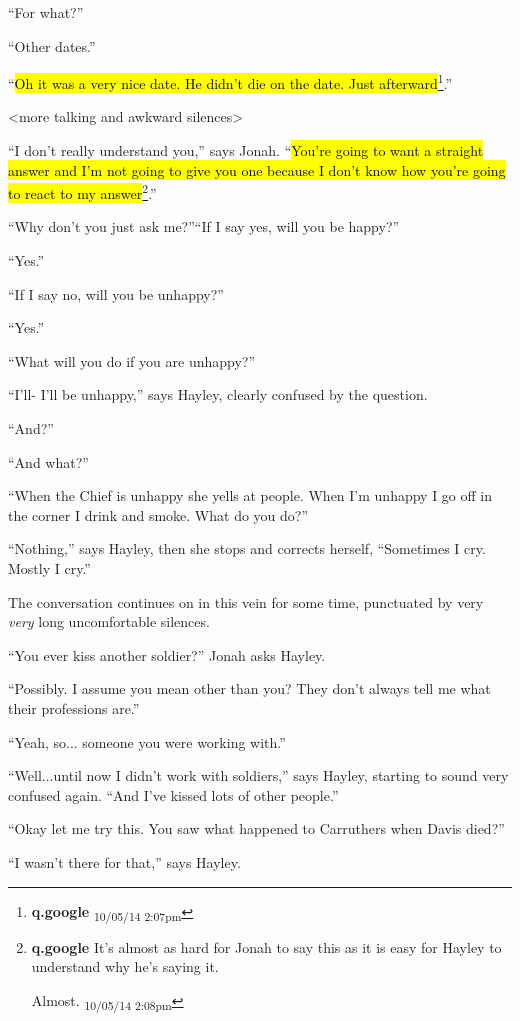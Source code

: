 ``For what?''

``Other dates.''

``\hl{Oh it was a very nice date.  He didn't die on the date.  Just afterward}\footnote{\textbf{q.google } \textsubscript{10/05/14 2:07pm}}.''

\textless more talking and awkward silences\textgreater 

``I don't really understand you,'' says Jonah.  ``\hl{You're going to want a straight answer and I'm not going to give you one because I don't know how you're going to react to my answer}\footnote{\textbf{q.google }It's almost as hard for Jonah to say this as it is easy for Hayley to understand why he's saying it.

Almost. \textsubscript{10/05/14 2:08pm}}.''

``Why don't you just ask me?''``If I say yes, will you be happy?''

``Yes.''

``If I say no, will you be unhappy?''

``Yes.''

``What will you do if you are unhappy?''

``I'll- I'll be unhappy,'' says Hayley, clearly confused by the question.

``And?''

``And what?''

``When the Chief is unhappy she yells at people.  When I'm unhappy I go off in the corner I drink and smoke. What do you do?''

``Nothing,'' says Hayley, then she stops and corrects herself, ``Sometimes I cry.  Mostly I cry.''

The conversation continues on in this vein for some time, punctuated by very \textit{very }long uncomfortable silences.   

``You ever kiss another soldier?'' Jonah asks Hayley.

``Possibly.  I assume you mean other than you?  They don't always tell me what their professions are.''

``Yeah, so... someone you were working with.''

``Well...until now I didn't work with soldiers,'' says Hayley, starting to sound very confused again. ``And I've kissed lots of other people.''

``Okay let me try this.  You saw what happened to Carruthers when Davis died?''

``I wasn't there for that,'' says Hayley.

